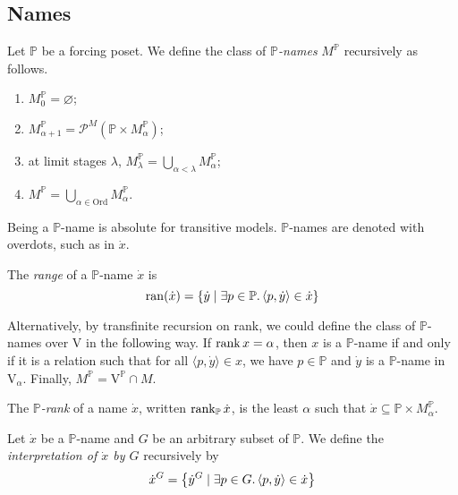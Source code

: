 \subsection{Names}
\begin{definition}
    Let \( \mathbb P \) be a forcing poset.
    We define the class of \emph{\( \mathbb P \)-names} \( M^{\mathbb P} \) recursively as follows.
    \begin{enumerate}
        \item \( M_0^{\mathbb P} = \varnothing \);
        \item \( M_{\alpha + 1}^{\mathbb P} = \mathcal P^M(\mathbb P \times M_\alpha^{\mathbb P}) \);
        \item at limit stages \( \lambda \), \( M_\lambda^{\mathbb P} = \bigcup_{\alpha < \lambda} M_\alpha^{\mathbb P} \);
        \item \( M^{\mathbb P} = \bigcup_{\alpha \in \mathrm{Ord}} M_\alpha^{\mathbb P} \).
    \end{enumerate}
\end{definition}
Being a \( \mathbb P \)-name is absolute for transitive models.
\( \mathbb P \)-names are denoted with overdots, such as in \( \dot x \).
\begin{definition}
    The \emph{range} of a \( \mathbb P \)-name \( \dot x \) is
    \[ \operatorname{ran}(\dot x) = \qty{\dot y \mid \exists p \in \mathbb P.\, \langle p, \dot y \rangle \in \dot x} \]
\end{definition}
\begin{remark}
    Alternatively, by transfinite recursion on rank, we could define the class of \( \mathbb P \)-names over \( \mathrm{V} \) in the following way.
    If \( \rank x = \alpha \), then \( x \) is a \( \mathbb P \)-name if and only if it is a relation such that for all \( \langle p, \dot y \rangle \in x \), we have \( p \in \mathbb P \) and \( \dot y \) is a \( \mathbb P \)-name in \( \mathrm{V}_\alpha \).
    Finally, \( M^{\mathbb P} = \mathrm{V}^{\mathbb P} \cap M \).
\end{remark}
\begin{definition}
    The \emph{\( \mathbb P \)-rank} of a name \( \dot x \), written \( \rank_{\mathbb P} \dot x \), is the least \( \alpha \) such that \( \dot x \subseteq \mathbb P \times M_\alpha^{\mathbb P} \).
\end{definition}
\begin{definition}
    Let \( \dot x \) be a \( \mathbb P \)-name and \( G \) be an arbitrary subset of \( \mathbb P \).
    We define the \emph{interpretation of \( \dot x \) by \( G \)} recursively by
    \[ \dot x^G = \qty{\dot y^G \mid \exists p \in G.\, \langle p, \dot y \rangle \in \dot x} \]
\end{definition}
